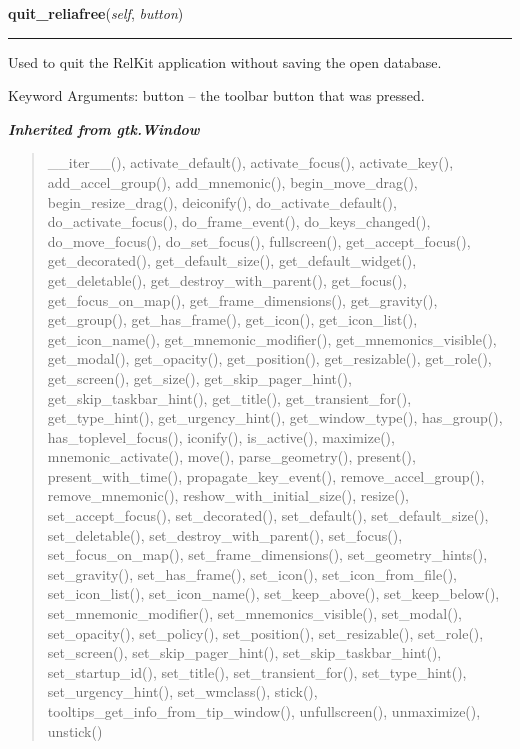 \hspace{.8\funcindent}\begin{boxedminipage}{\funcwidth}

    \raggedright \textbf{quit\_reliafree}(\textit{self}, \textit{button})

    \vspace{-1.5ex}

    \rule{\textwidth}{0.5\fboxrule}
\setlength{\parskip}{2ex}
    Used to quit the RelKit application without saving the open 
    database.

    Keyword Arguments: button -- the toolbar button that was pressed.

\setlength{\parskip}{1ex}
    \end{boxedminipage}


\large{\textbf{\textit{Inherited from gtk.Window}}}

\begin{quote}
\_\_iter\_\_(), activate\_default(), activate\_focus(), activate\_key(), add\_accel\_group(), add\_mnemonic(), begin\_move\_drag(), begin\_resize\_drag(), deiconify(), do\_activate\_default(), do\_activate\_focus(), do\_frame\_event(), do\_keys\_changed(), do\_move\_focus(), do\_set\_focus(), fullscreen(), get\_accept\_focus(), get\_decorated(), get\_default\_size(), get\_default\_widget(), get\_deletable(), get\_destroy\_with\_parent(), get\_focus(), get\_focus\_on\_map(), get\_frame\_dimensions(), get\_gravity(), get\_group(), get\_has\_frame(), get\_icon(), get\_icon\_list(), get\_icon\_name(), get\_mnemonic\_modifier(), get\_mnemonics\_visible(), get\_modal(), get\_opacity(), get\_position(), get\_resizable(), get\_role(), get\_screen(), get\_size(), get\_skip\_pager\_hint(), get\_skip\_taskbar\_hint(), get\_title(), get\_transient\_for(), get\_type\_hint(), get\_urgency\_hint(), get\_window\_type(), has\_group(), has\_toplevel\_focus(), iconify(), is\_active(), maximize(), mnemonic\_activate(), move(), parse\_geometry(), present(), present\_with\_time(), propagate\_key\_event(), remove\_accel\_group(), remove\_mnemonic(), reshow\_with\_initial\_size(), resize(), set\_accept\_focus(), set\_decorated(), set\_default(), set\_default\_size(), set\_deletable(), set\_destroy\_with\_parent(), set\_focus(), set\_focus\_on\_map(), set\_frame\_dimensions(), set\_geometry\_hints(), set\_gravity(), set\_has\_frame(), set\_icon(), set\_icon\_from\_file(), set\_icon\_list(), set\_icon\_name(), set\_keep\_above(), set\_keep\_below(), set\_mnemonic\_modifier(), set\_mnemonics\_visible(), set\_modal(), set\_opacity(), set\_policy(), set\_position(), set\_resizable(), set\_role(), set\_screen(), set\_skip\_pager\_hint(), set\_skip\_taskbar\_hint(), set\_startup\_id(), set\_title(), set\_transient\_for(), set\_type\_hint(), set\_urgency\_hint(), set\_wmclass(), stick(), tooltips\_get\_info\_from\_tip\_window(), unfullscreen(), unmaximize(), unstick()
\end{quote}


